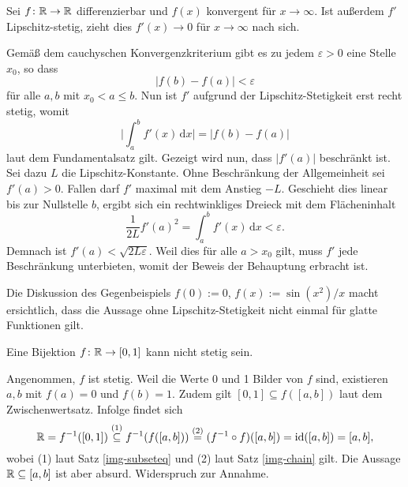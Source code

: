 \begin{Satz}
Sei $f\colon\mathbb R\to\mathbb R$ differenzierbar und $f(x)$ konvergent
für $x\to\infty$. Ist außerdem $f'$  Lipschitz-stetig,
zieht dies $f'(x)\to 0$ für $x\to\infty$ nach sich.
\end{Satz}
\begin{Beweis}
Gemäß dem cauchyschen Konvergenzkriterium gibt es zu jedem
$\varepsilon>0$ eine Stelle $x_0$, so dass
\begin{equation}
|f(b)-f(a)| < \varepsilon
\end{equation}
für alle $a,b$ mit $x_0 < a \le b$. Nun ist $f'$ aufgrund
der Lipschitz-Stetigkeit erst recht stetig, womit
\begin{equation}
\bigg|\int_a^b f'(x)\,\mathrm dx\bigg| = |f(b)-f(a)|
\end{equation}
laut dem Fundamentalsatz gilt. Gezeigt wird nun, dass $|f'(a)|$
beschränkt ist. Sei dazu $L$ die Lipschitz-Konstante. Ohne
Beschränkung der Allgemeinheit sei $f'(a)>0$. Fallen darf $f'$ maximal
mit dem Anstieg $-L$. Geschieht dies linear bis zur Nullstelle $b$,
ergibt sich ein rechtwinkliges Dreieck mit dem Flächeninhalt
\begin{equation}
\frac{1}{2L} f'(a)^2 = \int_a^b f'(x)\,\mathrm dx < \varepsilon.
\end{equation}
Demnach ist $f'(a) < \sqrt{2L\varepsilon}$. Weil dies für alle $a>x_0$
gilt, muss $f'$ jede Beschränkung unterbieten, womit
der Beweis der Behauptung erbracht ist.\;\qedsymbol
\end{Beweis}

\noindent
Die Diskussion des Gegenbeispiels $f(0):=0$, $f(x):=\sin(x^2)/x$ macht
ersichtlich, dass die Aussage ohne Lipschitz-Stetigkeit nicht einmal
für glatte Funktionen gilt.

\newpage
\begin{Satz}
Eine Bijektion $f\colon\mathbb R\to [0,1]$ kann nicht stetig sein.
\end{Satz}
\begin{Beweis}
Angenommen, $f$ ist stetig. Weil die Werte 0 und 1 Bilder von $f$
sind, existieren $a,b$ mit $f(a)=0$ und $f(b)=1$. Zudem gilt
$[0,1]\subseteq f([a,b])$ laut dem Zwischenwertsatz. Infolge findet sich
\[\mathbb R = f^{-1}([0,1]) \stackrel{\text{(1)}}\subseteq f^{-1}(f([a,b]))
\stackrel{\text{(2)}}= (f^{-1}\circ f)([a,b]) = \operatorname{id}([a,b]) = [a,b],\]
wobei (1) laut Satz \ref{img-subseteq} und (2) laut Satz
\ref{img-chain} gilt. Die Aussage $\mathbb R\subseteq [a,b]$ ist aber
absurd. Widerspruch zur Annahme.\,\qedsymbol
\end{Beweis}


